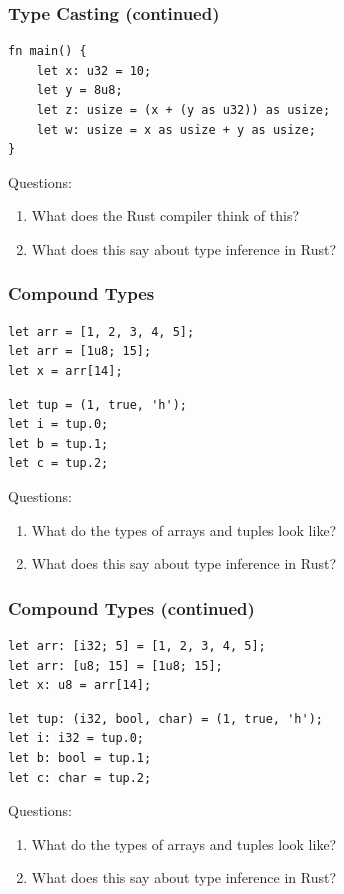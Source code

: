 \documentclass{slides}
\begin{document}
\begin{frame}[fragile]
\frametitle{Type Casting (continued)}
\begin{verbatim}
fn main() {
    let x: u32 = 10;
    let y = 8u8;
    let z: usize = (x + (y as u32)) as usize;
    let w: usize = x as usize + y as usize;
}
\end{verbatim}
Questions:
\begin{enumerate}
    \item What does the Rust compiler think of this?
    \item What does this say about type inference in Rust?
\end{enumerate}
\end{frame}

\begin{frame}[fragile]
\frametitle{Compound Types}
\begin{verbatim}
let arr = [1, 2, 3, 4, 5];
let arr = [1u8; 15];
let x = arr[14];
\end{verbatim}

\begin{verbatim}
let tup = (1, true, 'h');
let i = tup.0;
let b = tup.1;
let c = tup.2;
\end{verbatim}
Questions:
\begin{enumerate}
    \item What do the types of arrays and tuples look like?
    \item What does this say about type inference in Rust?
\end{enumerate}
\end{frame}

\begin{frame}[fragile]
\frametitle{Compound Types (continued)}
\begin{verbatim}
let arr: [i32; 5] = [1, 2, 3, 4, 5];
let arr: [u8; 15] = [1u8; 15];
let x: u8 = arr[14];
\end{verbatim}

\begin{verbatim}
let tup: (i32, bool, char) = (1, true, 'h');
let i: i32 = tup.0;
let b: bool = tup.1;
let c: char = tup.2;
\end{verbatim}
Questions:
\begin{enumerate}
    \item What do the types of arrays and tuples look like?
    \item What does this say about type inference in Rust?
\end{enumerate}
\end{frame}
\end{document}
